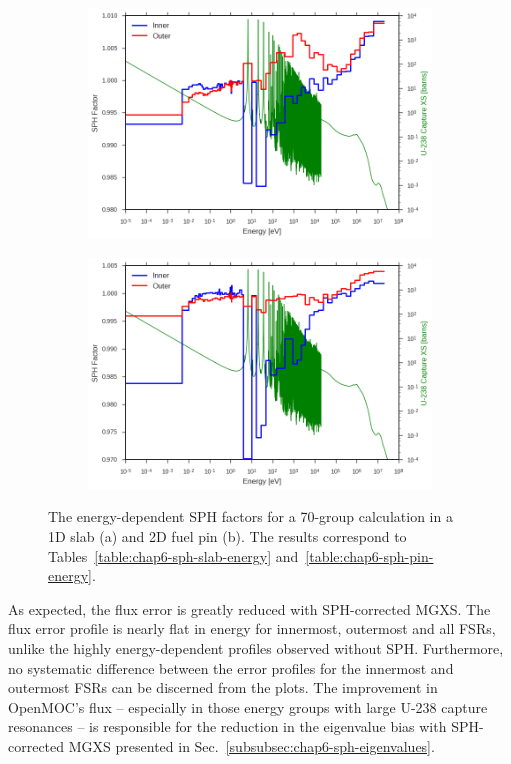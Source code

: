 \begin{figure}[h!]
\begin{subfigure}{.9\textwidth}
  \centering
  \includegraphics[width=\linewidth]{figures/sph/slab/sph-inner-outer}
  \caption{}
\end{subfigure}
\begin{subfigure}{.9\textwidth}
  \centering
  \includegraphics[width=\linewidth]{figures/sph/pin-cell/sph-inner-outer}
  \caption{}
\end{subfigure}
\caption[SPH factors by energy group]{The energy-dependent \ac{SPH} factors for a 70-group calculation in a 1D slab (a) and 2D fuel pin (b). The results correspond to Tables~\ref{table:chap6-sph-slab-energy} and~\ref{table:chap6-sph-pin-energy}.}
\label{fig:chap6-sph-energy}
\end{figure}

As expected, the flux error is greatly reduced with \ac{SPH}-corrected \ac{MGXS}. The flux error profile is nearly flat in energy for innermost, outermost and all \ac{FSR}s, unlike the highly energy-dependent profiles observed without \ac{SPH}. Furthermore, no systematic difference between the error profiles for the innermost and outermost \ac{FSR}s can be discerned from the plots. The improvement in OpenMOC's flux -- especially in those energy groups with large U-238 capture resonances -- is responsible for the reduction in the eigenvalue bias with \ac{SPH}-corrected \ac{MGXS} presented in Sec.~\ref{subsubsec:chap6-sph-eigenvalues}.


